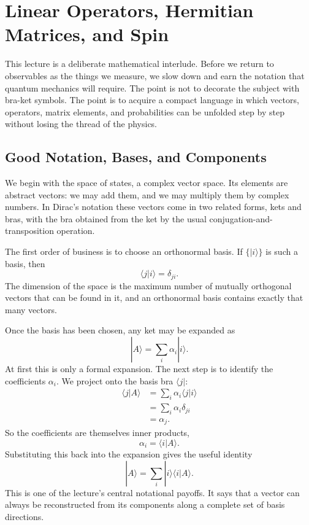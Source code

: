 \chapter{Linear Operators, Hermitian Matrices, and Spin}

This lecture is a deliberate mathematical interlude. Before we return to observables as the things we measure, we slow down and earn the notation that quantum mechanics will require. The point is not to decorate the subject with bra-ket symbols. The point is to acquire a compact language in which vectors, operators, matrix elements, and probabilities can be unfolded step by step without losing the thread of the physics.

\section{Good Notation, Bases, and Components}

We begin with the space of states, a complex vector space. Its elements are abstract vectors: we may add them, and we may multiply them by complex numbers. In Dirac's notation these vectors come in two related forms, kets and bras, with the bra obtained from the ket by the usual conjugation-and-transposition operation.

The first order of business is to choose an orthonormal basis. If \(\{|i\rangle\}\) is such a basis, then
\begin{equation}
\langle j|i\rangle=\delta_{ji}.
\end{equation}
The dimension of the space is the maximum number of mutually orthogonal vectors that can be found in it, and an orthonormal basis contains exactly that many vectors.

Once the basis has been chosen, any ket may be expanded as
\begin{equation}
|A\rangle=\sum_i \alpha_i |i\rangle.
\end{equation}
At first this is only a formal expansion. The next step is to identify the coefficients \(\alpha_i\). We project onto the basis bra \(\langle j|\):
\begin{align}
\langle j|A\rangle
  &= \sum_i \alpha_i \langle j|i\rangle \\
  &= \sum_i \alpha_i \delta_{ji} \\
  &= \alpha_j.
\end{align}
So the coefficients are themselves inner products,
\begin{equation}
\alpha_i=\langle i|A\rangle.
\end{equation}
Substituting this back into the expansion gives the useful identity
\begin{equation}
|A\rangle=\sum_i |i\rangle\langle i|A\rangle.
\end{equation}
This is one of the lecture's central notational payoffs. It says that a vector can always be reconstructed from its components along a complete set of basis directions.

